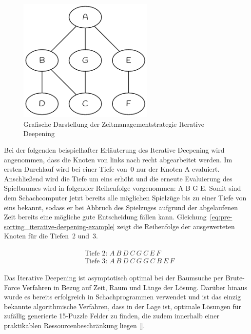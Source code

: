 \begin{figure}[H]
    \centering
    \includegraphics[width=0.6\textwidth]{images/theory/pre-sorting_iterative-deepening.png}
    \caption[Grafische Darstellung der Zeitmanagementstrategie Iterative Deepening]{Grafische Darstellung der Zeitmanagementstrategie Iterative Deepening}
    \label{fig:pre-sorting_iterative-deepening}
\end{figure}

\noindent Bei der folgenden beispielhafter Erläuterung des Iterative Deepening wird angenommen, dass die Knoten von links nach recht abgearbeitet werden.
Im ersten Durchlauf wird bei einer Tiefe von~0 nur der Knoten A evaluiert.
Anschließend wird die Tiefe um eins erhöht und die erneute Evaluierung des Spielbaumes wird in folgender Reihenfolge vorgenommen: A B G E.
Somit sind dem Schachcomputer jetzt bereits alle möglichen Spielzüge bis zu einer Tiefe von eins bekannt, sodass er bei Abbruch des Spielzuges aufgrund der abgelaufenen Zeit bereits eine mögliche gute Entscheidung fällen kann.
Gleichung~\ref{eq:pre-sorting_iterative-deepening-example} zeigt die Reihenfolge der ausgewerteten Knoten für die Tiefen~2 und~3.

\begin{align} \label{eq:pre-sorting_iterative-deepening-example}
\begin{split}
    & \text{Tiefe 2: } A\ B\ D\ C\ G\ C\ E\ F\\
    & \text{Tiefe 3: } A\ B\ D\ C\ G\ G\ C\ B\ E\ F
\end{split}
\end{align}

Das Iterative Deepening ist asymptotisch optimal bei der Baumsuche per Brute-Force Verfahren in Bezug auf Zeit, Raum und Länge der Lösung.
Darüber hinaus wurde es bereits erfolgreich in Schachprogrammen verwendet und ist das einzig bekannte algorithmische Verfahren, dass in der Lage ist, optimale Lösungen für zufällig generierte 15-Puzzle Felder zu finden, die zudem innerhalb einer praktikablen Ressourcenbeschränkung liegen [\cite{Korf1985}].
